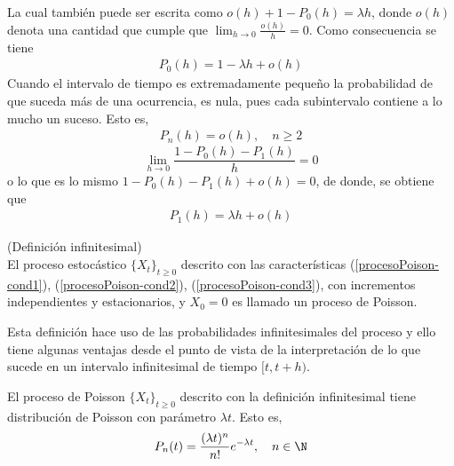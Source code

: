     \begin{comment}
    $X([a,b])$ es el número de ocurrencias en el intervalo $[a,b]$, sean $w_i$ el tiempo de espera antes de que pase una ocurrencia adicional después de la $i$-ésima ocurrencia.
    Dado $\epsilon>0$, se toma $\delta=\min\{w_i, i=1,2,\ldots,\lambda\}$, si $|h|<\delta$ , $X([(i-1)h,ih])$, $i=1,2,\ldots\lambda$ a lo mucho puede ser 1. entonces $1-P_0(h)=P_1(h)$ $|\frac{(1-P_0(h))}{h}-\lambda|=|N(P_1(h))-\lambda|=|N\frac{\lambda}{N}-\lambda|=0<\epsilon $, esto es:
    \end{comment}
    La cual también puede ser escrita como $o(h)+1-P_0(h)=\lambda h$, donde $o(h)$ denota una cantidad que cumple que $\lim_{h\rightarrow 0}\frac{o(h)}{h}=0$. Como consecuencia se tiene
    \begin{eqnarray}
        P_0(h)=1-\lambda h+o(h)
        \label{procesoPoison-cond1}
    \end{eqnarray}
    Cuando el intervalo de tiempo es extremadamente pequeño la probabilidad de que suceda más de una ocurrencia, es nula, pues cada subintervalo contiene a lo mucho un suceso. Esto es,
    \begin{eqnarray}
        P_n(h)=o(h),\quad n\geq 2
        \label{procesoPoison-cond2}
    \end{eqnarray}
    $$\lim_{h\rightarrow 0}\frac{1-P_0(h)-P_1(h)}{h}=0$$
    o lo que es lo mismo $1-P_0(h)-P_1(h)+o(h)=0$, de donde, se obtiene que
    \begin{eqnarray}
        P_1(h)=\lambda h+o(h)
         \label{procesoPoison-cond3}
    \end{eqnarray}
    \begin{Def}(Definición infinitesimal)\\
         El proceso estocástico $\{X_t\}_{t\geq 0}$
        descrito con las características (\ref{procesoPoison-cond1}), (\ref{procesoPoison-cond2}), (\ref{procesoPoison-cond3}), con incrementos independientes y estacionarios, y $X_0=0$ es llamado un proceso de Poisson.
    \end{Def}
    Esta definición hace uso de las probabilidades infinitesimales del proceso y ello tiene algunas ventajas desde el punto de vista de la interpretación de
    lo que sucede en un intervalo infinitesimal de tiempo $[t,t+h)$.
    \begin{Prop}
        El proceso de Poisson $\{X_t\}_{t\geq 0}$ descrito con la definición infinitesimal tiene distribución de Poisson con parámetro $\lambda t.$ Esto es,
        $$P_n(t)=\frac{(\lambda t)^n}{n!}e^{-\lambda t}, \quad n\in\N$$
    \end{Prop}
